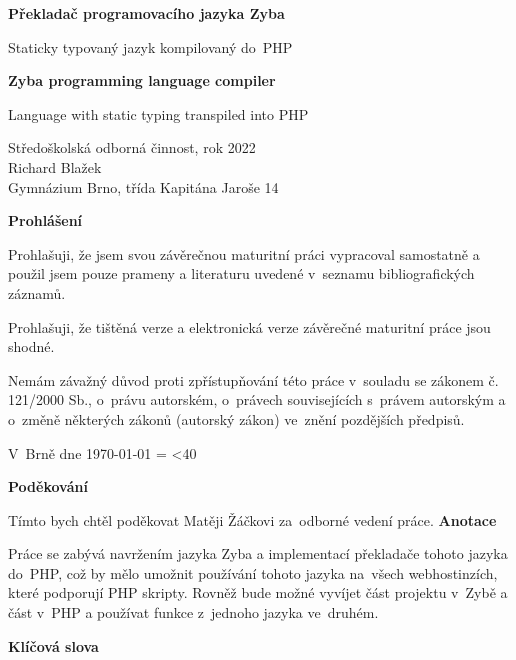 \documentclass[a4paper,12pt]{article}
\author{Richard Blažek}
\makeatletter
\newcommand{\repeatchar}[2]{
  \begingroup
  \my@repeat@count=\z@
  \@whilenum\my@repeat@count<#1\do{#2\advance\my@repeat@count\@ne}
  \endgroup
}
\makeatother
\begin{document}
\begin{titlepage}
    \begin{center}

  \vspace*{3.5cm}            
  \Huge
  \textbf{Překladač programovacího jazyka Zyba}
            
  \vspace{0.5cm}
  \LARGE
  Staticky typovaný jazyk kompilovaný do~PHP
        
  \vspace*{1.5cm}
  \Huge
  \textbf{Zyba programming language compiler}
            
  \vspace{0.5cm}
  \LARGE
  Language with static typing transpiled into PHP
            
  \vfill
            
  \large
        Středoškolská odborná činnost, rok 2022\\
  Richard Blažek\\
  Gymnázium Brno, třída Kapitána Jaroše 14
    \end{center}
\end{titlepage}
\thispagestyle{empty}
\Large\textbf{Prohlášení}\normalsize

Prohlašuji, že jsem svou závěrečnou maturitní práci vypracoval samostatně a použil jsem pouze prameny a literaturu uvedené v~seznamu bibliografických záznamů.

Prohlašuji, že tištěná verze a elektronická verze závěrečné maturitní práce jsou shodné.

Nemám závažný důvod proti zpřístupňování této práce v~souladu se zákonem č. 121/2000 Sb., o~právu autorském, o~právech souvisejících s~právem autorským a o~změně některých zákonů (autorský zákon) ve~znění pozdějších předpisů. 

V~Brně dne \today{} \repeatchar{40}{.}
\newpage
\thispagestyle{empty}
\Large\textbf{Poděkování}\normalsize

Tímto bych chtěl poděkovat Matěji Žáčkovi za~odborné vedení práce.
\newpage
\thispagestyle{empty}
\Large\textbf{Anotace}\normalsize

Práce se zabývá navržením jazyka Zyba a implementací překladače tohoto jazyka do~PHP, což by mělo umožnit používání tohoto jazyka na~všech webhostinzích, které podporují PHP skripty. Rovněž bude možné vyvíjet část projektu v~Zybě a část v~PHP a používat funkce z~jednoho jazyka ve~druhém.

\Large\textbf{Klíčová slova}\normalsize
\end{document}
